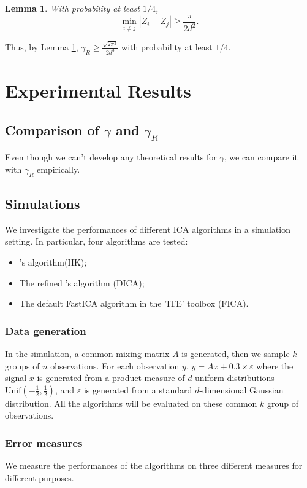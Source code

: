 \documentclass[twoside]{article}
\newtheorem{lemma}{Lemma}[section]
\theoremstyle{definition}
\newcommand{\eps}{\varepsilon}
\begin{document}
\begin{lemma}
\label{lem:CauchyGap}
With probability at least $1/4$,
\[
\min_{i\neq j} \left\vert Z_i - Z_j \right\vert \ge \frac{\pi}{2d^2}.
\]
\end{lemma}
Thus, by Lemma \ref{lem:CauchyGap}, $\gamma_R \ge \frac{\sqrt{2\pi^3}}{2d^3}$ with probability at least $1/4$.

\section{Experimental Results}
\label{sec:ExpRes}
\subsection{Comparison of $\gamma$ and $\gamma_R$}
Even though we can't develop any theoretical results for $\gamma$, we can compare it with $\gamma_R$ empirically.

\subsection{Simulations}
We investigate the performances of different ICA algorithms in a simulation setting. In particular, four algorithms are tested: 
\begin{itemize}
\item \citet{DHsu2012}'s algorithm(HK);
\item The refined \citet{DHsu2012}'s algorithm (DICA);
\item The default FastICA algorithm in the 'ITE' toolbox \cite{szabo12separation} (FICA). 
\end{itemize}
\subsubsection{Data generation}
In the simulation, a common mixing matrix $A$ is generated, then we sample $k$ groups of $n$ observations. 
For each observation $y$, $y = Ax+ 0.3\times\eps$ where the signal $x$ is generated from a product measure of $d$ uniform distributions $\text{Unif}(-\frac12, \frac12)$, and $\eps$ is generated from a standard $d$-dimensional Gaussian distribution. 
All the algorithms will be evaluated on these common $k$ group of observations.
\subsubsection{Error measures}
We measure the performances of the algorithms on three different measures for different purposes.
\end{document}

